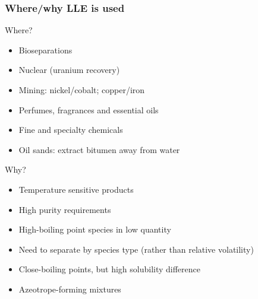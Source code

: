 \begin{frame}\frametitle{Where/why LLE is used}
	Where?
	\begin{itemize}
		\item	Bioseparations
		\item	Nuclear (uranium recovery)
		\item	Mining: nickel/cobalt; copper/iron
		\item	Perfumes, fragrances and essential oils
		\item	Fine and specialty chemicals
		\item	Oil sands: extract bitumen away from water
	\end{itemize}
	Why?
	\begin{itemize}
		\item	Temperature sensitive products
		\item	High purity requirements
		\item	High-boiling point species in low quantity
		\item	Need to separate by species type (rather than relative volatility)
		\item	Close-boiling points, but high solubility difference
		\item	Azeotrope-forming mixtures
	\end{itemize}
\end{frame}


